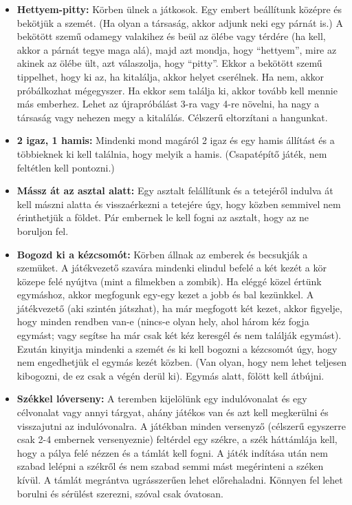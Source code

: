 \documentclass[a4paper, 12pt, twoside, openright]{article}
\begin{document}
\begin{itemize}
\item \textbf{Hettyem-pitty:} Körben ülnek a játkosok. Egy embert beállítunk középre és bekötjük a szemét. (Ha olyan a társaság, akkor adjunk neki egy párnát is.) A bekötött szemű odamegy valakihez és beül az ölébe vagy térdére (ha kell, akkor a párnát tegye maga alá), majd azt mondja, hogy ``hettyem'', mire az akinek az ölébe ült, azt válaszolja, hogy ``pitty''. Ekkor a bekötött szemű tippelhet, hogy ki az, ha kitalálja, akkor helyet cserélnek. Ha nem, akkor próbálkozhat mégegyszer. Ha ekkor sem találja ki, akkor tovább kell mennie más emberhez. Lehet az újrapróbálást 3-ra vagy 4-re növelni, ha nagy a társaság vagy nehezen megy a kitalálás. Célszerű eltorzítani a hangunkat. 

\item \textbf{2 igaz, 1 hamis:} Mindenki mond magáról 2 igaz és egy hamis állítást és a többieknek ki kell találnia, hogy melyik a hamis. (Csapatépítő játék, nem feltétlen kell pontozni.)

\item \textbf{Mássz át az asztal alatt:} Egy asztalt felállítunk és a tetejéről indulva át kell mászni alatta és visszaérkezni a tetejére úgy, hogy közben semmivel nem érinthetjük a földet. Pár embernek le kell fogni az asztalt, hogy az ne boruljon fel.

\item \textbf{Bogozd ki a kézcsomót:} Körben állnak az emberek és becsukják a szemüket. A játékvezető szavára mindenki elindul befelé a két kezét a kör közepe felé nyújtva (mint a filmekben a zombik). Ha eléggé közel értünk egymáshoz, akkor megfogunk egy-egy kezet a jobb és bal kezünkkel. A játékvezető (aki szintén játszhat), ha már megfogott két kezet, akkor figyelje, hogy minden rendben van-e (nincs-e olyan hely, ahol három kéz fogja egymást; vagy segítse ha már csak két kéz keresgél és nem találják  egymást). Ezután kinyitja mindenki a szemét és ki kell bogozni a kézcsomót úgy, hogy nem engedhetjük el egymás kezét közben. (Van olyan, hogy nem lehet teljesen kibogozni, de ez csak a végén derül ki). Egymás alatt, fölött kell átbújni.

\item \textbf{Székkel lóverseny:} A teremben kijelölünk egy indulóvonalat és egy célvonalat vagy annyi tárgyat, ahány játékos van és azt kell megkerülni és visszajutni az indulóvonalra. A játékban minden versenyző (célszerű egyszerre csak 2-4 embernek versenyeznie) feltérdel egy székre, a szék háttámlája kell, hogy a pálya felé nézzen és a támlát kell fogni. A játék indítása után nem szabad lelépni a székről és nem szabad semmi mást megérinteni a széken kívül. A támlát megrántva ugrásszerűen lehet előrehaladni. Könnyen fel lehet borulni és sérülést szerezni, szóval csak óvatosan.


\end{itemize}
\end{document}
